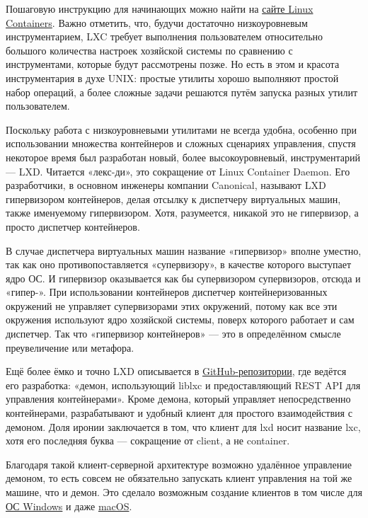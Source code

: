 \documentclass[14pt, a4paper]{article}
\begin{document}
Пошаговую инструкцию для начинающих можно найти на \href{https://linuxcontainers.org/ru/lxc/getting-started/}{сайте Linux Containers}. Важно отметить, что,
будучи достаточно низкоуровневым инструментарием, LXC требует выполнения пользователем
относительно большого количества настроек хозяйской системы по сравнению с инструментами,
которые будут рассмотрены позже. Но есть в этом и красота инструментария в духе UNIX: простые
утилиты хорошо выполняют простой набор операций, а более сложные задачи решаются путём
запуска разных утилит пользователем.

Поскольку работа с низкоуровневыми утилитами не всегда удобна, особенно при использовании
множества контейнеров и сложных сценариях управления, спустя некоторое время был разработан
новый, более высокоуровневый, инструментарий — LXD. Читается «лекс-ди», это сокращение от
Linux Container Daemon. Его разработчики, в основном инженеры компании Canonical, называют LXD
гипервизором контейнеров, делая отсылку к диспетчеру виртуальных машин, также именуемому
гипервизором. Хотя, разумеется, никакой это не гипервизор, а просто диспетчер контейнеров.

В случае диспетчера виртуальных машин название «гипервизор» вполне уместно, так как оно
противопоставляется «супервизору», в качестве которого выступает ядро ОС. И гипервизор
оказывается как бы супервизором супервизоров, отсюда и «гипер-». 
При использовании контейнеров диспетчер контейнеризованных окружений не управляет
супервизорами этих окружений, потому как все эти окружения используют ядро хозяйской системы,
поверх которого работает и сам диспетчер. Так что «гипервизор контейнеров» — это в определённом
смысле преувеличение или метафора.

Ещё более ёмко и точно LXD описывается в \href{https://github.com/lxc/lxd}{GitHub-репозитории}, где ведётся его разработка: «демон,
использующий liblxc и предоставляющий REST API для управления контейнерами». Кроме демона,
который управляет непосредственно контейнерами, разрабатывают и удобный клиент для простого
взаимодействия с демоном. Доля иронии заключается в том, что клиент для lxd носит название lxc,
хотя его последняя буква — сокращение от client, а не container.

Благодаря такой клиент-серверной архитектуре возможно удалённое управление демоном, то есть
совсем не обязательно запускать клиент управления на той же машине, что и демон. Это сделало
возможным создание клиентов в том числе для \href{https://chocolatey.org/packages/lxc}{ОС Windows} и даже \href{https://chocolatey.org/packages/lxc}{macOS}.
\end{document}
